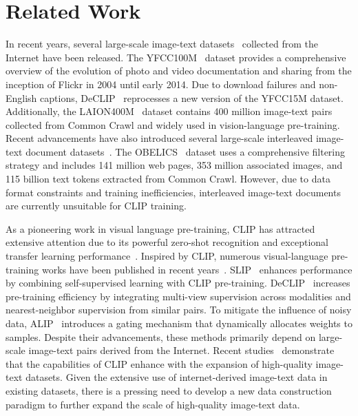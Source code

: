 \section{Related Work}
\label{sec:formatting}

 In recent years, several large-scale image-text datasets~\cite{MSCOCO, clark2017simple, goyal2017making, kakaobrain2022coyo700m, Densefusion1M} collected from the Internet have been released. The YFCC100M~\cite{YFCC100M} dataset provides a comprehensive overview of the evolution of photo and video documentation and sharing from the inception of Flickr in 2004 until early 2014. Due to download failures and non-English captions, DeCLIP~\cite{DECLIP} reprocesses a new version of the YFCC15M dataset. Additionally, the LAION400M~\cite{laion400M} dataset contains 400 million image-text pairs collected from Common Crawl and widely used in vision-language pre-training. Recent advancements have also introduced several large-scale interleaved image-text document datasets~\cite{omnicorpus, MMC4, Obelics}. The OBELICS~\cite{Obelics} dataset uses a comprehensive filtering strategy and includes 141 million web pages, 353 million associated images, and 115 billion text tokens extracted from Common Crawl. However, due to data format constraints and training inefficiencies, interleaved image-text documents are currently unsuitable for CLIP training.


As a pioneering work in visual language pre-training, CLIP has attracted extensive attention due to its powerful zero-shot recognition and exceptional transfer learning performance~\cite{wang2024learn, tang2024amu, shao2024deil, martin2024transductive}. Inspired by CLIP, numerous visual-language pre-training works have been published in recent years~\cite{mu2022slip, DECLIP, ALIP}. SLIP~\cite{mu2022slip} enhances performance by combining self-supervised learning with CLIP pre-training. DeCLIP~\cite{DECLIP} increases pre-training efficiency by integrating multi-view supervision across modalities and nearest-neighbor supervision from similar pairs. To mitigate the influence of noisy data, ALIP~\cite{ALIP} introduces a gating mechanism that dynamically allocates weights to samples. Despite their advancements, these methods primarily depend on large-scale image-text pairs derived from the Internet. Recent studies~\cite{li2024scaling,wang2025scaling} demonstrate that the capabilities of CLIP enhance with the expansion of high-quality image-text datasets. Given the extensive use of internet-derived image-text data in existing datasets, there is a pressing need to develop a new data construction paradigm to further expand the scale of high-quality image-text data.


